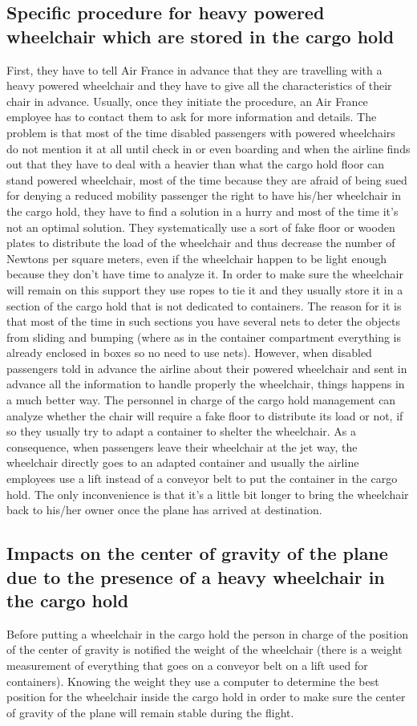 \subsection{Specific procedure for heavy powered wheelchair which are stored in the cargo hold}
First, they have to tell Air France in advance that they are travelling with a heavy powered wheelchair and they have to give all the characteristics of their chair in advance. Usually, once they initiate the procedure, an Air France employee has to contact them to ask for more information and details.
The problem is that most of the time disabled passengers with powered wheelchairs do not mention it at all until check in or even boarding and when the airline finds out that they have to deal with a heavier than what the cargo hold floor can stand powered wheelchair, most of the time because they are afraid of being sued for denying a reduced mobility passenger the right to have his/her wheelchair in the cargo hold, they have to find a solution in a hurry and most of the time it’s not an optimal solution. They systematically use a sort of fake floor or wooden plates to distribute the load of the wheelchair and thus decrease the number of Newtons per square meters, even if the wheelchair happen to be light enough because they don’t have time to analyze it. In order to make sure the wheelchair will remain on this support they use ropes to tie it and they usually store it in a section of the cargo hold that is not dedicated to containers. The reason for it is that most of the time in such sections you have several nets to deter the objects from sliding and bumping (where as in the container compartment everything is already enclosed in boxes so no need to use nets).
However, when disabled passengers told in advance the airline about their powered wheelchair and sent in advance all the information to handle properly the wheelchair, things happens in a much better way. The personnel in charge of the cargo hold management can analyze whether the chair will require a fake floor to distribute its load or not, if so they usually try to adapt a container to shelter the wheelchair. As a consequence, when passengers leave their wheelchair at the jet way, the wheelchair directly goes to an adapted container and usually the airline employees use a lift instead of a conveyor belt to put the container in the cargo hold. The only inconvenience is that it’s a little bit longer to bring the wheelchair back to his/her owner once the plane has arrived at destination.

\subsection{Impacts on the center of gravity of the plane due to the presence of a heavy wheelchair in the cargo hold}
Before putting a wheelchair in the cargo hold the person in charge of the position of the center of gravity is notified the weight of the wheelchair (there is a weight measurement of everything that goes on a conveyor belt on a lift used for containers). Knowing the weight they use a computer to determine the best position for the wheelchair inside the cargo hold in order to make sure the center of gravity of the plane will remain stable during the flight.

